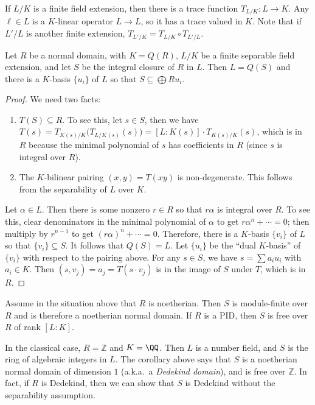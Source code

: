  If $L/K$ is a finite field extension, then there is a trace function $T_{L/K}:L\to K$.
 Any $\ell\in L$ is a $K$-linear operator $L\to L$, so it has a trace valued in $K$. Note
 that if $L'/L$ is another finite extension, $T_{L'/K}= T_{L/K} \circ T_{L'/L}$.
 \begin{theorem}
   Let $R$ be a normal domain, with $K=Q(R)$, $L/K$ be a finite separable field
   extension, and let $S$ be the integral closure of $R$ in $L$. Then $L=Q(S)$ and there
   is a $K$-basis $\{u_i\}$ of $L$ so that $S\subseteq \bigoplus Ru_i$.
 \end{theorem}
 \begin{proof}
   We need two facts:
   \begin{enumerate}
     \item $T(S)\subseteq R$. To see this, let $s\in S$, then we have $T(s)=T_{K(s)/K}
     \bigl( T_{L/K(s)}(s)\bigr) = [L:K(s)] \cdot T_{K(s)/K}(s)$, which is in $R$ because
     the minimal polynomial of $s$ has coefficients in $R$ (since $s$ is integral over
     $R$).

     \item The $K$-bilinear pairing $(x,y) = T(xy)$ is non-degenerate. This follows from
     the separability of $L$ over $K$.
   \end{enumerate}
   Let $\alpha\in L$. Then there is some nonzero $r\in R$ so that $r\alpha$ is
   integral over $R$. To see this, clear denominators in the minimal polynomial of
   $\alpha$ to get $r\alpha^n + \cdots =0$; then multiply by $r^{n-1}$ to get
   $(r\alpha)^n+\cdots = 0$. Therefore, there is a $K$-basis $\{v_i\}$ of $L$ so that
   $\{v_i\}\subseteq S$. It follows that $Q(S)=L$. Let $\{u_i\}$ be the ``dual
   $K$-basis'' of $\{v_i\}$ with respect to the pairing above. For any $s\in S$, we
   have $s = \sum a_i u_i$ with $a_i\in K$. Then $(s,v_j)=a_j = T(s\cdot v_j)$ is in the
   image of $S$ under $T$, which is in $R$.
 \end{proof}
 \begin{corollary}
   Assume in the situation above that $R$ is noetherian. Then $S$ is module-finite over
   $R$ and is therefore a noetherian normal domain. If $R$ is a PID, then $S$ is free
   over $R$ of rank $[L:K]$.
 \end{corollary}
 In the classical case, $R=\mathbb{Z}$ and $K=\QQ$. Then $L$ is a number field, and $S$ is the
 ring of algebraic integers in $L$. The corollary above says that $S$ is a noetherian
 normal domain of dimension $1$ (a.k.a.~a \emph{Dedekind domain}), and is free over
 $\mathbb{Z}$. In fact, if $R$ is Dedekind, then we can show that $S$ is Dedekind without the
 separability assumption.


